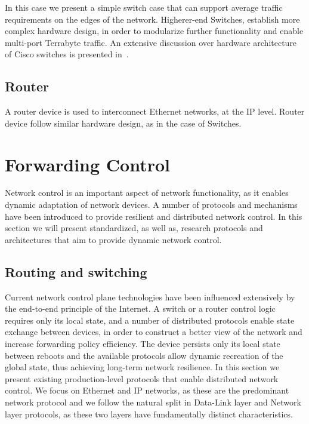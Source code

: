 In this case we present a simple switch case that can support average traffic
requirements on the edges of the network. Higherer-end Switches, establish more 
complex hardware design, in order to modularize further
functionality and enable multi-port Terrabyte traffic. An extensive discussion
over hardware architecture of Cisco switches is presented in~\cite{cisco-routers}.

\subsection{Router}

A router device is used to interconnect Ethernet networks, at the IP level.
Router device follow similar hardware design, as in the case of Switches. 


\section{Forwarding Control} \label{sec:backoground:netcontrol}

Network control is an important aspect of network functionality, as it enables
dynamic adaptation of network devices.  A number of protocols and mechanisms have 
been introduced to provide resilient and distributed network control. In this section
we will present standardized, as well as, research protocols and architectures
that aim to provide dynamic network control.

\subsection{Routing and switching}

Current network control plane technologies have been influenced extensively by the
end-to-end principle of the Internet. A switch or a router control logic
requires only its local state, and a number of distributed protocols
enable state exchange between devices, in order to construct a better view 
of the network and increase forwarding policy efficiency. The
device persists only its local state between reboots and the available protocols
allow dynamic recreation of the global state, thus achieving long-term
network resilience.  In this section we present existing production-level protocols that
enable distributed network control. We focus on Ethernet and IP networks, as
these are the predominant network protocol and we follow the natural split in
Data-Link layer and Network layer protocols, as these two layers have fundamentally
distinct characteristics.

